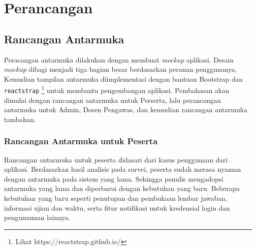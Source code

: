 \chapter{Perancangan}
\label{chap:perancangan}

\section{Rancangan Antarmuka}
    Peracangan antarmuka dilakukan dengan membuat \textit{mockup} aplikasi. Desain \textit{mockup} dibagi 
    menjadi tiga bagian besar berdasarkan peranan penggunanya.
    Kemudian tampilan antarmuka diimplementasi dengan bantuan Bootstrap dan \texttt{reactstrap}
    \footnote{Lihat https://reactstrap.github.io/} untuk
    membantu pengembangan aplikasi. Pembahasan akan dimulai dengan rancangan 
    antarmuka untuk Perserta, lalu perancangan antarmuka untuk Admin, Dosen Pengawas, dan kemudian rancangan 
    antarmuka tambahan.

\subsection{Rancangan Antarmuka untuk Peserta}
    Rancangan antarmuka untuk peserta didasari dari kasus penggunaan dari aplikasi. Berdasarkan hasil analisis
    pada survei, peserta sudah merasa nyaman dengan antarmuka pada sistem yang lama. Sehingga penulis
    mengadopsi antarmuka yang lama dan diperbarui dengan kebutuhan yang baru. Beberapa kebutuhan yang baru
    seperti penutupan dan pembukaan lembar jawaban, informasi ujian dan waktu, serta fitur notifikasi untuk
    kredensial login dan pengumuman lainnya.
    
